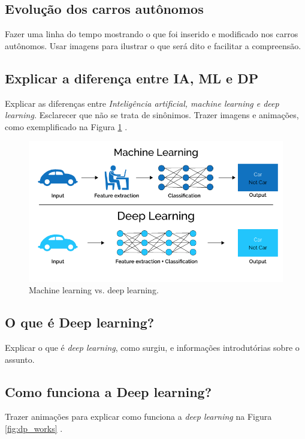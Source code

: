 \documentclass[12pt,a4paper]{article}
\begin{document}
    \subsection{Evolução dos carros autônomos}
    \par Fazer uma linha do tempo mostrando o que foi inserido e modificado nos carros autônomos. Usar imagens para ilustrar o que será dito e facilitar a compreensão.

    \subsection{Explicar a diferença entre IA, ML e DP}
    \par Explicar as diferenças entre \emph{Inteligência artificial, machine learning e deep learning.} Esclarecer que não se trata de sinônimos. Trazer imagens e animações, como exemplificado na Figura \ref{fig:ml_dp} \cite{2}.

    \begin{figure}[H]
        \centering
        \includegraphics[scale=0.5]{ml_dp.png}
        \caption{Machine learning vs. deep learning.}
        \label{fig:ml_dp}
    \end{figure}

    \subsection{O que é Deep learning?}
    \par Explicar o que é \emph{deep learning}, como surgiu, e informações introdutórias sobre o assunto.

    \subsection{Como funciona a Deep learning?}
    \par Trazer animações para explicar como funciona a \emph{deep learning} na Figura \ref{fig:dp_works} \cite{2}.
\end{document}
